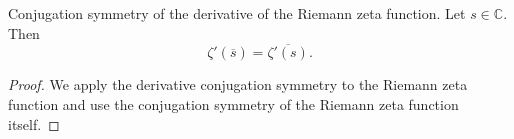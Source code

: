 \begin{theorem}
\label{deriv_riemannZeta_conj}
\leanok
Conjugation symmetry of the derivative of the Riemann zeta function. Let $s \in \mathbb{C}$.
    Then $$\zeta'(\overline{s}) = \overline{\zeta'(s)}.$$
\end{theorem}
\begin{proof}
\leanok
We apply the derivative conjugation symmetry to the Riemann zeta function and use the
    conjugation symmetry of the Riemann zeta function itself.
\end{proof}
